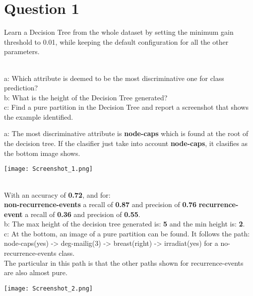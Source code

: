 \section{Question 1}

\begin{question}
     Learn a Decision Tree from the whole dataset by setting the minimum gain threshold to 0.01, while
keeping the default configuration for all the other parameters.

     \\
     a: Which attribute is deemed to be the most discriminative one for class prediction?
     \\
     b: What is the height of the Decision Tree generated?
     \\
     c: Find a pure partition in the Decision Tree and report a screenshot that shows the
    example identified.
\end{question}
\begin{anwer}
     a: The most discriminative attribute is \textbf{node-caps} which is found at the root of the
     decision tree. If the clasifier just take into account \textbf{node-caps}, it clasifies as the bottom image shows.

     \begin{center}
          \texttt{[image: Screenshot\_1.png]}
    \end{center}
     \\
     With an accuracy of \textbf{0.72}, and for:
     \\
     \textbf{non-recurrence-events} a recall of \textbf{0.87} and precision of \textbf{0.76}
     \textbf{recurrence-event} a recall of \textbf{0.36} and precision of \textbf{0.55}.
     \\
     \linebreak
     b: The max height of the decision tree generated is: \textbf{5} and the min height is: \textbf{2}.
     \\
     \linebreak
     c: At the bottom, an image of a pure partition can be found. It follows the path:
     \\
     node-caps(yes) -> deg-mailig(3) -> breast(right) -> irradiat(yes) for a no-recurrence-events class.
     \\
     The particular in this path is that the other
     paths shown for recurrence-events are also almost pure.
     \\
     \begin{center}
          \texttt{[image: Screenshot\_2.png]}
     \end{center}
\end{anwer}
\pagebreak